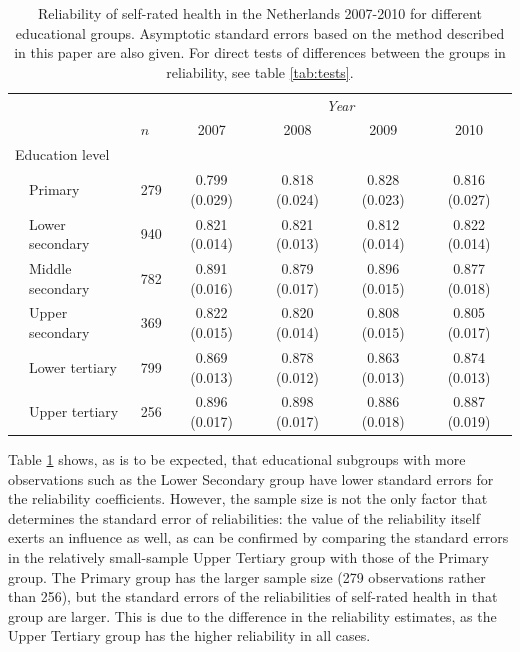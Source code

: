 \documentclass[a4paper,11pt]{article}
\newcommand{\0}{\boldsymbol{0}}
\begin{document}
\begin{table}[tbh]
\begin{center}
\begin{tabular}{lllcccc}  \hline  \hline
&&&  \multicolumn{4}{c}{\emph{Year}}\\\cline{4-7}
&&$n$& 2007&2008&2009&2010\\
  \hline
  \multicolumn{2}{l}{Education level}\\
& Primary	   & 279  & 0.799 (0.029) & 0.818 (0.024) & 0.828 (0.023) & 0.816 (0.027) \\ 
& Lower secondary  & 940  & 0.821 (0.014) & 0.821 (0.013) & 0.812 (0.014) & 0.822 (0.014) \\ 
& Middle secondary & 782  & 0.891 (0.016) & 0.879 (0.017) & 0.896 (0.015) & 0.877 (0.018) \\ 
& Upper secondary  & 369  & 0.822 (0.015) & 0.820 (0.014) & 0.808 (0.015) & 0.805 (0.017) \\ 
& Lower tertiary   & 799  & 0.869 (0.013) & 0.878 (0.012) & 0.863 (0.013) & 0.874 (0.013) \\ 
& Upper tertiary   & 256  & 0.896 (0.017) & 0.898 (0.017) & 0.886 (0.018) & 0.887 (0.019) \\ 
  \hline     \hline
\end{tabular}
\caption{Reliability of self-rated health in the Netherlands 2007-2010 for different educational groups. 
Asymptotic standard errors based on the method described in this paper are also given. For direct tests of 
differences between the groups in reliability, see table \ref{tab:tests}.}\label{tab:health-education}
\end{center}
\end{table}

Table \ref{tab:health-education} shows, as is to be expected, that educational subgroups with more observations 
such as the Lower Secondary group have lower standard errors for the reliability coefficients. However, the sample size
is not the only factor that determines the standard error of reliabilities: the value of the reliability itself exerts an influence as well,
as can be confirmed by comparing the standard errors in the relatively small-sample Upper Tertiary group with those of the Primary group.
The Primary group has the larger sample size (279 observations rather than 256), but the standard errors of the reliabilities
of self-rated health in that group are larger. This is due to the difference in the reliability estimates, as the Upper Tertiary group 
has the higher reliability in all cases.
\end{document}
